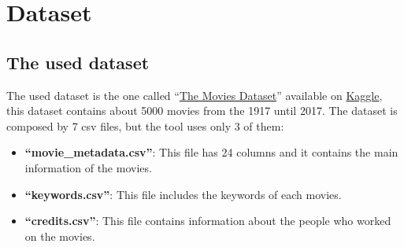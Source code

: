 \documentclass[]{article}
\newcommand{\quotes}[1]{``#1''}
\begin{document}
\section{Dataset}
\subsection{The used dataset}
The used dataset is the one called \quotes{\href{https://www.kaggle.com/datasets/rounakbanik/the-movies-dataset}{The Movies Dataset}} available on \href{https://www.kaggle.com/}{Kaggle}, this dataset contains about 5000 movies from the 1917 until 2017.\newline
The dataset is composed by 7 csv files, but the tool uses only 3 of them:
\begin{itemize}
	\item \textbf{\quotes{movie\_metadata.csv}}: This file has 24 columns and it contains the main information of the movies.
	\item \textbf{\quotes{keywords.csv}}: This file includes the keywords of each movies.
	\item \textbf{\quotes{credits.csv}}: This file contains information about the people who worked on the movies. 
\end{itemize}
\end{document}
